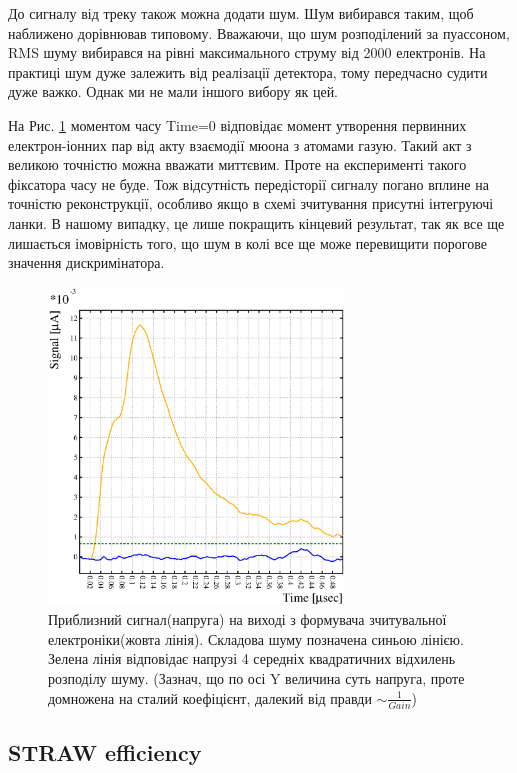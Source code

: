 \documentclass[]{article}
\begin{document}
	До сигналу від треку також можна додати шум. Шум вибирався таким, щоб наближено дорівнював типовому. Вважаючи, що шум розподілений за пуассоном, RMS шуму вибирався на рівні максимального струму від 2000 електронів. На практиці шум дуже залежить від реалізації детектора, тому передчасно судити дуже важко. Однак ми не мали іншого вибору як цей.
	 
	На Рис. \ref{fig:signal_example} моментом часу Time=0 відповідає момент утворення первинних електрон-іонних пар від акту взаємодії мюона з атомами газую. Такий акт з великою точністю можна вважати миттєвим. Проте на експерименті такого фіксатора часу не буде. Тож відсутність передісторії сигналу погано вплине на точністю реконструкції, особливо якщо в схемі зчитування присутні інтегруючі ланки. В нашому випадку, це лише покращить кінцевий результат, так як все ще лишається імовірність того, що шум в колі все ще може перевищити порогове значення дискримінатора.
	
	\begin{figure}
	\centering
	\includegraphics[width=0.7\textwidth]{signal_noise_threshold.eps}
	\caption{ Приблизний сигнал(напруга) на виході з формувача зчитувальної електроніки(жовта лінія). Складова шуму позначена синьою лінією. Зелена лінія відповідає напрузі 4 середніх квадратичних відхилень розподілу шуму. (Зазнач, що по осі Y величина суть напруга, проте домножена на сталий коефіцієнт, далекий від правди $\sim \frac{1}{Gain}$)}
	\label{fig:signal_example}
	\end{figure}
	
	\subsection{ STRAW efficiency}
		
\end{document}
